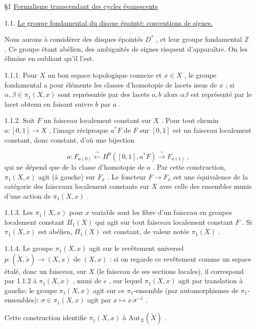 \S 1 \underline{Formalisme transcendant des cycles évanescents}


1.1. \underline{Le groupe fondamental du disque épointé: conventions de signes.}

Nous aurons à considérer des disques épointés $D^*$ , et leur groupe fondamental $\mathbb{Z}$ . Ce groupe étant abélien, des ambiguités de signes risquent d'apparaître. On les élimine en oubliant qu'il l'est.

1.1.1. Pour $X$ un bon espace topologique connexe et $x \in X$ , le groupe fondamental a pour éléments les classes d'homotopie de lacets issus de $x$ ; si $\alpha, \beta \in \pi_1(X, x)$ sont représentés par des lacets $a, b$ alors $\alpha \beta$ est représenté par le lacet obtenu en faisant suivre $b$ par $a$ .

1.1.2. Soit $F$ un faisceau localement constant sur $X$ . Pour tout chemin $a : [0, 1] \to X$ , l'image réciproque $a^*F$ de $F$ sur $[0, 1]$ est un faisceau localement constant, donc constant, d'où une bijection

\begin{equation*}
a : F_{a(0)} \xleftarrow{\ \sim\ } H^0([0, 1], a^*F) \xrightarrow{\ \sim\ } F_{a(1)} \ ,
\end{equation*}
qui ne dépend que de la classe d'homotopie de $a$ . Par cette construction, $\pi_1(X, x)$ agit (à gauche) sur $F_x$ . Le foncteur $F \to F_x$ est une équivalence de la catégorie des faisceaux localement constants sur $X$ avec celle des ensembles munis d'une action de $\pi_1(X, x)$ .

1.1.3. Les $\pi_1(X, x)$ pour $x$ variable sont les fibre d'un faisceau en groupes localement constant $\Pi_1(X)$ qui agit sur tout faisceau localement constant $F$ . Si $\pi_1(X, x)$ est abélien, $\Pi_1(X)$ est constant, de valeur notée $\pi_1(X)$ .

1.1.4. Le groupe $\pi_1(X, x)$ agit sur le revêtement universel $p : (\tilde{X}, \tilde{x}) \to (X, x)$ de $(X, x)$ : si on regarde ce revêtement comme un espace étalé, donc un faisceau, sur $X$ (le faisceau de ses sections locales), il correspond par 1.1.2 à $\pi_1(X, x)$ ,
muni de $e$ , sur lequel $\pi_1(X, x)$ agit par translation à gauche; le groupe $\pi_1(X, x)$ agit sur ce $\pi_1$-ensemble (par automorphismes de $\pi_1$-ensembles): $\sigma \in \pi_1(X, x)$ agit par $x \longmapsto x\,\sigma^{-1}$ .

Cette construction identifie $\pi_1(X, x)$ à $\mathrm{Aut}_X(\tilde{X})$ .

